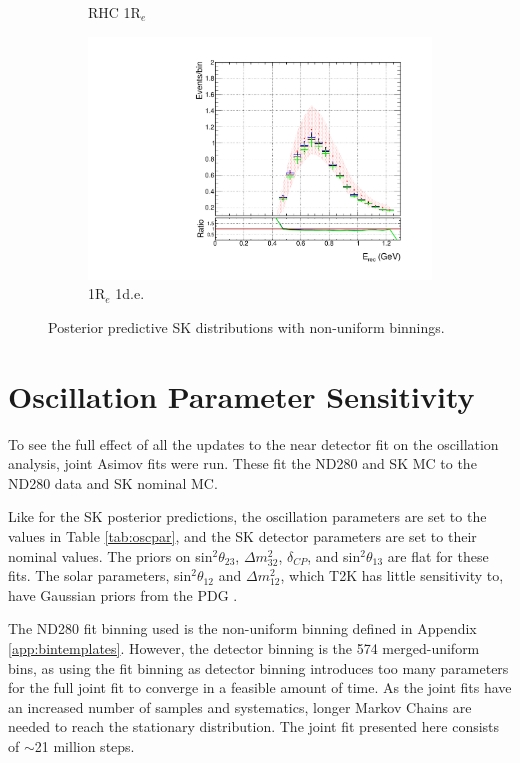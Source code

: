 \begin{figure}[!htbp]
\begin{subfigure}{.49\textwidth}
   \caption{RHC 1R$_{e}$}
  \label{fig:skppnuebar}
  \end{subfigure}
\begin{subfigure}{.49\textwidth}
  \centering
  \includegraphics[width=0.95\linewidth]{figs/polySKnue1pi}
   \caption{1R$_{e}$ 1d.e.}
  \label{fig:skppnue1pi}
\end{subfigure}
\caption{Posterior predictive SK distributions with non-uniform binnings.}
\label{fig:skpppoly}
\end{figure}

\section{Oscillation Parameter Sensitivity}\label{sec:oscpar}

To see the full effect of all the updates to the near detector fit on the oscillation analysis, joint Asimov fits were run. These fit the ND280 and SK MC to the ND280 data and SK nominal MC. 

Like for the SK posterior predictions, the oscillation parameters are set to the values in Table \ref{tab:oscpar}, and the SK detector parameters are set to their nominal values. The priors on sin$^2\theta_{23}$, $\Delta m_{32}^2$, $\delta_{CP}$, and sin$^2\theta_{13}$ are flat for these fits. The solar parameters, sin$^2\theta_{12}$ and $\Delta m_{12}^2$, which T2K has little sensitivity to, have Gaussian priors from the PDG \cite{pdg}.

The ND280 fit binning used is the non-uniform binning defined in Appendix \ref{app:bintemplates}. However, the detector binning is the 574 merged-uniform bins, as using the fit binning as detector binning introduces too many parameters for the full joint fit to converge in a feasible amount of time. As the joint fits have an increased number of samples and systematics, longer Markov Chains are needed to reach the stationary distribution. The joint fit presented here consists of $\sim$21 million steps. 

